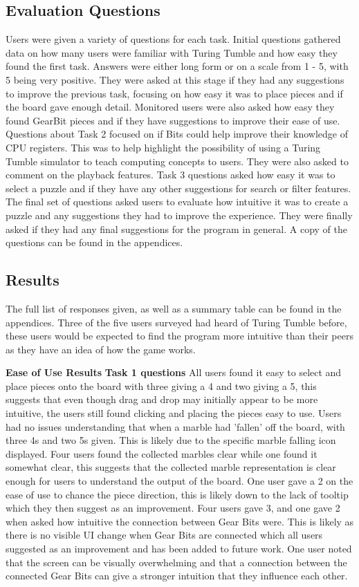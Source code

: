 \documentclass{l4proj}
\begin{document}
\subsection{Evaluation Questions}
Users were given a variety of questions for each task. Initial questions gathered data on how many users were familiar with Turing Tumble and how easy they found the first task. Answers were either long form or on a scale from 1 - 5, with 5 being very positive. They were asked at this stage if they had any suggestions to improve the previous task, focusing on how easy it was to place pieces and if the board gave enough detail. Monitored users were also asked how easy they found GearBit pieces and if they have suggestions to improve their ease of use. Questions about Task 2 focused on if Bits could help improve their knowledge of CPU registers. This was to help highlight the possibility of using a Turing Tumble simulator to teach computing concepts to users. They were also asked to comment on the playback features. Task 3 questions asked how easy it was to select a puzzle and if they have any other suggestions for search or filter features. The final set of questions asked users to evaluate how intuitive it was to create a puzzle and any suggestions they had to improve the experience. They were finally asked if they had any final suggestions for the program in general. A copy of the questions can be found in the appendices.

\subsection{Results}
The full list of responses given, as well as a summary table can be found in the appendices. Three of the five users surveyed had heard of Turing Tumble before, these users would be expected to find the program more intuitive than their peers as they have an idea of how the game works.

\textbf{Ease of Use Results}
\textbf{Task 1 questions}
All users found it easy to select and place pieces onto the board with three giving a 4 and two giving a 5, this suggests that even though drag and drop may initially appear to be more intuitive, the users still found clicking and placing the pieces easy to use. Users had no issues understanding that when a marble had 'fallen' off the board, with three 4s and two 5s given. This is likely due to the specific marble falling icon displayed. Four users found the collected marbles clear while one found it somewhat clear, this suggests that the collected marble representation is clear enough for users to understand the output of the board.  One user gave a 2 on the ease of use to chance the piece direction, this is likely down to the lack of tooltip which they then suggest as an improvement. Four users gave 3, and one gave 2 when asked how intuitive the connection between Gear Bits were. This is likely as there is no visible UI change when Gear Bits are connected which all users suggested as an improvement and has been added to future work. One user noted that the screen can be visually overwhelming and that a connection between the connected Gear Bits can give a stronger intuition that they influence each other. 
\end{document}
